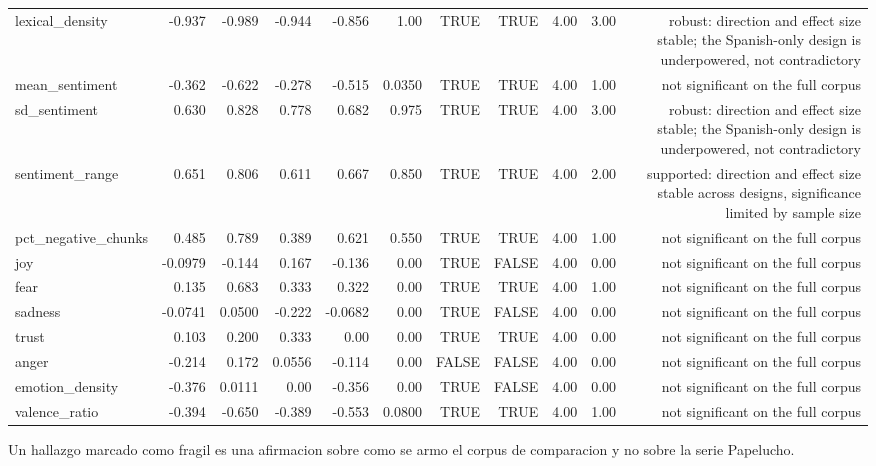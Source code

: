 \begin{table}[htbp]
\begin{tabular}{lrrrrrrrrrr}
lexical\_density & -0.937 & -0.989 & -0.944 & -0.856 & 1.00 & TRUE & TRUE & 4.00 & 3.00 & robust: direction and effect size stable; the Spanish-only design is underpowered, not contradictory \\
mean\_sentiment & -0.362 & -0.622 & -0.278 & -0.515 & 0.0350 & TRUE & TRUE & 4.00 & 1.00 & not significant on the full corpus \\
sd\_sentiment & 0.630 & 0.828 & 0.778 & 0.682 & 0.975 & TRUE & TRUE & 4.00 & 3.00 & robust: direction and effect size stable; the Spanish-only design is underpowered, not contradictory \\
sentiment\_range & 0.651 & 0.806 & 0.611 & 0.667 & 0.850 & TRUE & TRUE & 4.00 & 2.00 & supported: direction and effect size stable across designs, significance limited by sample size \\
pct\_negative\_chunks & 0.485 & 0.789 & 0.389 & 0.621 & 0.550 & TRUE & TRUE & 4.00 & 1.00 & not significant on the full corpus \\
joy & -0.0979 & -0.144 & 0.167 & -0.136 & 0.00 & TRUE & FALSE & 4.00 & 0.00 & not significant on the full corpus \\
fear & 0.135 & 0.683 & 0.333 & 0.322 & 0.00 & TRUE & TRUE & 4.00 & 1.00 & not significant on the full corpus \\
sadness & -0.0741 & 0.0500 & -0.222 & -0.0682 & 0.00 & TRUE & FALSE & 4.00 & 0.00 & not significant on the full corpus \\
trust & 0.103 & 0.200 & 0.333 & 0.00 & 0.00 & TRUE & TRUE & 4.00 & 0.00 & not significant on the full corpus \\
anger & -0.214 & 0.172 & 0.0556 & -0.114 & 0.00 & FALSE & FALSE & 4.00 & 0.00 & not significant on the full corpus \\
emotion\_density & -0.376 & 0.0111 & 0.00 & -0.356 & 0.00 & TRUE & FALSE & 4.00 & 0.00 & not significant on the full corpus \\
valence\_ratio & -0.394 & -0.650 & -0.389 & -0.553 & 0.0800 & TRUE & TRUE & 4.00 & 1.00 & not significant on the full corpus \\
\bottomrule
\end{tabular}
\vspace{0.5em}
\begin{minipage}{\linewidth}\footnotesize Un hallazgo marcado como fragil es una afirmacion sobre como se armo el corpus de comparacion y no sobre la serie Papelucho.\end{minipage}
\end{table}


